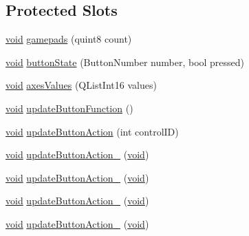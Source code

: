 \subsection*{\-Protected \-Slots}
\begin{DoxyCompactItemize}
\item 
\hyperlink{group___u_a_v_objects_plugin_ga444cf2ff3f0ecbe028adce838d373f5c}{void} \hyperlink{group___g_c_s_control_gadget_plugin_ga058f3b55102371451400fd4bea33b523}{gamepads} (quint8 count)
\item 
\hyperlink{group___u_a_v_objects_plugin_ga444cf2ff3f0ecbe028adce838d373f5c}{void} \hyperlink{group___g_c_s_control_gadget_plugin_gaa59744420fc5100a14c1f340a163484e}{button\-State} (\-Button\-Number number, bool pressed)
\item 
\hyperlink{group___u_a_v_objects_plugin_ga444cf2ff3f0ecbe028adce838d373f5c}{void} \hyperlink{group___g_c_s_control_gadget_plugin_ga2875164469455c55a959fcd1f56b0e6d}{axes\-Values} (\-Q\-List\-Int16 values)
\item 
\hyperlink{group___u_a_v_objects_plugin_ga444cf2ff3f0ecbe028adce838d373f5c}{void} \hyperlink{group___g_c_s_control_gadget_plugin_ga98bbb0244baf8177656bc529e5b421a9}{update\-Button\-Function} ()
\item 
\hyperlink{group___u_a_v_objects_plugin_ga444cf2ff3f0ecbe028adce838d373f5c}{void} \hyperlink{group___g_c_s_control_gadget_plugin_ga9f6949caad5edd88b24436348e3d73b3}{update\-Button\-Action} (int control\-I\-D)
\item 
\hyperlink{group___u_a_v_objects_plugin_ga444cf2ff3f0ecbe028adce838d373f5c}{void} \hyperlink{group___g_c_s_control_gadget_plugin_ga849965b0456db4a2de097fcb4989f41a}{update\-Button\-Action\-\_} (\hyperlink{group___u_a_v_objects_plugin_ga444cf2ff3f0ecbe028adce838d373f5c}{void})
\item 
\hyperlink{group___u_a_v_objects_plugin_ga444cf2ff3f0ecbe028adce838d373f5c}{void} \hyperlink{group___g_c_s_control_gadget_plugin_ga70d72214e80e72b7cb944bec376e1d0c}{update\-Button\-Action\-\_} (\hyperlink{group___u_a_v_objects_plugin_ga444cf2ff3f0ecbe028adce838d373f5c}{void})
\item 
\hyperlink{group___u_a_v_objects_plugin_ga444cf2ff3f0ecbe028adce838d373f5c}{void} \hyperlink{group___g_c_s_control_gadget_plugin_gaa5dc90f10992f27d651980287df92744}{update\-Button\-Action\-\_} (\hyperlink{group___u_a_v_objects_plugin_ga444cf2ff3f0ecbe028adce838d373f5c}{void})
\item 
\hyperlink{group___u_a_v_objects_plugin_ga444cf2ff3f0ecbe028adce838d373f5c}{void} \hyperlink{group___g_c_s_control_gadget_plugin_gae9f48cda98010eea595957d5674e7df3}{update\-Button\-Action\-\_} (\hyperlink{group___u_a_v_objects_plugin_ga444cf2ff3f0ecbe028adce838d373f5c}{void})

\end{DoxyCompactItemize}

